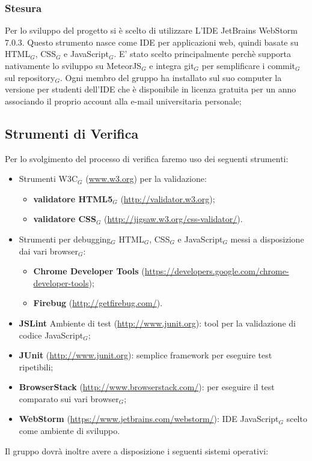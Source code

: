 \subsubsection{Stesura}
    Per lo sviluppo del progetto si è scelto di utilizzare L’IDE JetBrains WebStorm 7.0.3. Questo strumento nasce come IDE per applicazioni web, quindi basate su HTML$_G$, CSS$_G$ e JavaScript$_G$. E' stato scelto principalmente perchè supporta nativamente lo sviluppo su MeteorJS$_G$ e integra git$_G$ per semplificare i commit$_G$ sul repository$_G$. Ogni membro del gruppo ha installato sul suo computer la versione per studenti dell'IDE che è disponibile in licenza gratuita per un anno associando il proprio account alla e-mail universitaria personale; 


\subsection{Strumenti di Verifica}
Per lo svolgimento del processo di verifica faremo uso dei seguenti strumenti:
\begin{itemize}
	\item Strumenti W3C$_G$ (\href{www.w3.org}{www.w3.org}) per la validazione:
	    \begin{itemize}
	    	\item \textbf{validatore HTML5$_G$} (\href{http://validator.w3.org}{http://validator.w3.org});
	    	\item \textbf{validatore CSS$_G$}
	    	(\href{http://jigsaw.w3.org/css-validator/}{http://jigsaw.w3.org/css-validator/}).
	    \end{itemize}
	
	\item Strumenti per debugging$_G$ HTML$_G$, CSS$_G$ e JavaScript$_G$ messi a disposizione dai vari browser$_G$:
	    \begin{itemize}
	    	\item \textbf{Chrome Developer Tools} (\href{https://developers.google.com/chrome-developer-tools}
	    	{https://developers.google.com/chrome-developer-tools});
	    	\item \textbf{Firebug}
	    	(\href{http://getfirebug.com/}{http://getfirebug.com/}).
	    \end{itemize}
	\item \textbf{JSLint} Ambiente di test (\href{http://www.junit.org}{http://www.junit.org}): tool per la validazione di codice JavaScript$_G$;
	\item \textbf{JUnit} (\href{http://www.junit.org}{http://www.junit.org}): semplice framework per eseguire test ripetibili;
	\item \textbf{BrowserStack} (\href{http://www.browserstack.com/}{http://www.browserstack.com/}):  per eseguire il test comparato sui vari browser$_G$;
	\item \textbf{WebStorm} (\href{https://www.jetbrains.com/webstorm/}{https://www.jetbrains.com/webstorm/}): IDE JavaScript$_G$ scelto come ambiente di sviluppo.
\end{itemize}
Il gruppo dovrà inoltre avere a disposizione i seguenti sistemi operativi:

